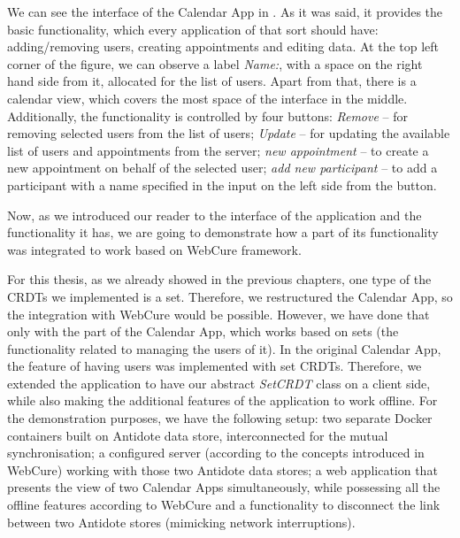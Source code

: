 We can see the interface of the Calendar App in . As it was said, it provides the basic functionality, which every application of that sort should have: adding/removing users, creating appointments and editing data. At the top left corner of the figure, we can observe a label \textit{Name:}, with a space on the right hand side from it, allocated for the list of users. Apart from that, there is a calendar view, which covers the most space of the interface in the middle. Additionally, the functionality is controlled by four buttons: \textit{Remove} -- for removing selected users from the list of users; \textit{Update} -- for updating the available list of users and appointments from the server; \textit{new appointment} -- to create a new appointment on behalf of the selected user; \textit{add new participant} -- to add a participant with a name specified in the input on the left side from the button. 

Now, as we introduced our reader to the interface of the application and the functionality it has, we are going to demonstrate how a part of its functionality was integrated to work based on WebCure framework. 

For this thesis, as we already showed in the previous chapters, one type of the CRDTs we implemented is a set. Therefore, we restructured the Calendar App, so the integration with WebCure would be possible. However, we have done that only with the part of the Calendar App, which works based on sets (the functionality related to managing the users of it). In the original Calendar App, the feature of having users was implemented with set CRDTs. Therefore, we extended the application to have our abstract \textit{SetCRDT} class on a client side, while also making the additional features of the application to work offline. For the demonstration purposes, we have the following setup: two separate Docker containers built on Antidote data store, interconnected for the mutual synchronisation; a configured server (according to the concepts introduced in WebCure) working with those two Antidote data stores; a web application that presents the view of two Calendar Apps simultaneously, while possessing all the offline features according to WebCure and a functionality to disconnect the link between two Antidote stores (mimicking network interruptions). 

